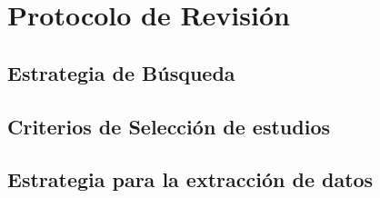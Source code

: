 \chapter{Protocolo de Revisión}
\section{Estrategia de Búsqueda}
\section{Criterios de Selección de estudios}
\section{Estrategia para la extracción de datos}